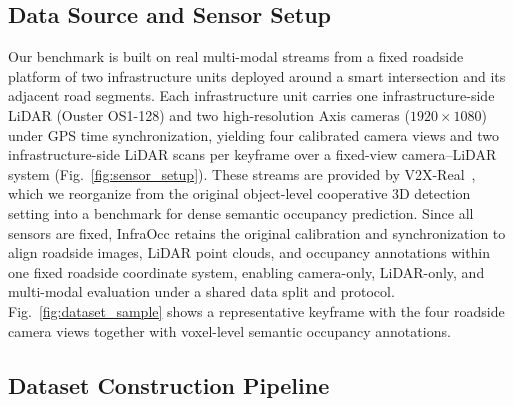 \subsection{Data Source and Sensor Setup}
\label{sec:benchmark_sensor}



Our benchmark is built on real multi-modal streams from a fixed roadside
platform of two infrastructure units deployed around a smart intersection and
its adjacent road segments. Each infrastructure unit carries one infrastructure-side LiDAR
(Ouster OS1-128) and two high-resolution Axis cameras ($1920\times1080$) under
GPS time synchronization, yielding four calibrated camera views and two
infrastructure-side LiDAR scans per keyframe over a fixed-view camera--LiDAR
system (Fig.~\ref{fig:sensor_setup}). These streams are provided by
V2X-Real~\cite{V2XReal}, which we
reorganize from the original object-level cooperative 3D detection setting into a
benchmark for dense semantic occupancy prediction.
Since all sensors are fixed, InfraOcc retains the original calibration and
synchronization to align roadside images, LiDAR point clouds, and occupancy
annotations within one fixed roadside coordinate system, enabling camera-only,
LiDAR-only, and multi-modal evaluation under a shared data split and protocol.
Fig.~\ref{fig:dataset_sample} shows a representative keyframe with the four
roadside camera views together with voxel-level semantic occupancy annotations.

\subsection{Dataset Construction Pipeline}
\label{sec:benchmark_pipeline}

